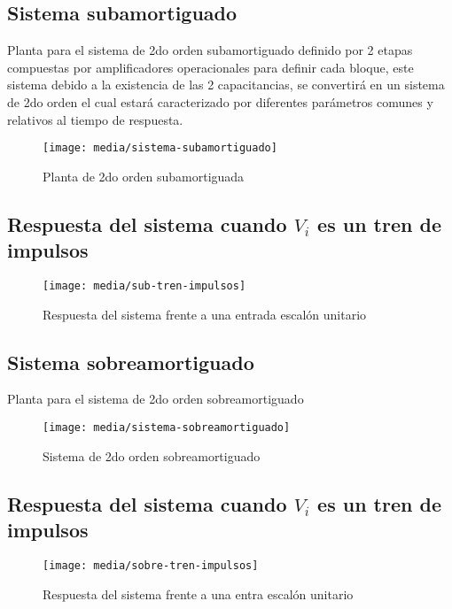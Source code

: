 \documentclass[conference]{IEEEtran}
\begin{document}
	\subsection{Sistema subamortiguado}
	Planta para el sistema de 2do orden subamortiguado definido por 2 etapas compuestas por amplificadores operacionales para definir cada bloque, este sistema debido a la existencia de las 2 capacitancias, se convertirá en un sistema de 2do orden el cual estará caracterizado por diferentes parámetros comunes y relativos al tiempo de respuesta.
	\begin{figure}[h]
		\centering
		\texttt{[image: media/sistema-subamortiguado]}
		\caption{Planta de 2do orden subamortiguada}
		\label{fig:sistema-subamortiguado}
	\end{figure}
	
	\subsection{Respuesta del sistema cuando $V_i$ es un tren de impulsos}
	
	\begin{figure}[h]
		\centering
		\texttt{[image: media/sub-tren-impulsos]}
		\caption{Respuesta del sistema frente a una entrada escalón unitario}
		\label{fig:sub-tren-impulsos}
	\end{figure}
	
	\subsection{Sistema sobreamortiguado}
	Planta para el sistema de 2do orden sobreamortiguado
	
	\begin{figure}[h]
		\centering
		\texttt{[image: media/sistema-sobreamortiguado]}
		\caption{Sistema de 2do orden sobreamortiguado}
		\label{fig:sistema-sobreamortiguado}
	\end{figure}
	
	\subsection{Respuesta del sistema cuando $V_i$ es un tren de impulsos}
	
	\begin{figure}[h]
		\centering
		\texttt{[image: media/sobre-tren-impulsos]}
		\caption{Respuesta del sistema frente a una entra escalón unitario}
		\label{fig:sobre-tren-impulsos}
	\end{figure}
	
	
	
\end{document}

